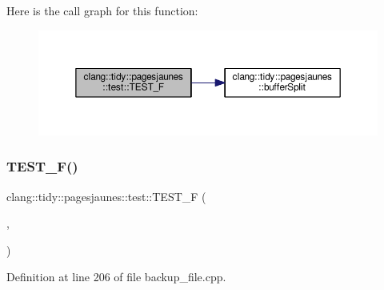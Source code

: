 Here is the call graph for this function\+:
\nopagebreak
\begin{figure}[H]
\begin{center}
\leavevmode
\includegraphics[width=350pt]{namespaceclang_1_1tidy_1_1pagesjaunes_1_1test_a165e5998fefd397abdb120da57c0ff98_cgraph}
\end{center}
\end{figure}
\mbox{\label{namespaceclang_1_1tidy_1_1pagesjaunes_1_1test_acbdee46e3e175a0551d9ce34f3fdf1db}} 
\subsubsection{\texorpdfstring{T\+E\+S\+T\+\_\+\+F()}{TEST\_F()}\hspace{0.1cm}{\footnotesize\ttfamily [45/57]}}
{\footnotesize\ttfamily clang\+::tidy\+::pagesjaunes\+::test\+::\+T\+E\+S\+T\+\_\+F (\begin{DoxyParamCaption}\item[{\hyperlink{classclang_1_1tidy_1_1pagesjaunes_1_1test_1_1_backup_file}{Backup\+File}}]{,  }\item[{Many\+Backup\+Log3}]{ }\end{DoxyParamCaption})}



Definition at line 206 of file backup\+\_\+file.\+cpp.

